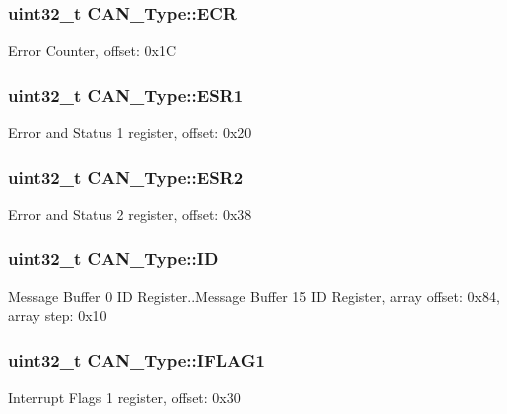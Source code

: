 \subsubsection[{\texorpdfstring{E\+CR}{ECR}}]{ uint32\+\_\+t C\+A\+N\+\_\+\+Type\+::\+E\+CR}\hypertarget{structCAN__Type_a561aab7ad4e38ae9ba75477bfbd74c63}{}\label{structCAN__Type_a561aab7ad4e38ae9ba75477bfbd74c63}
Error Counter, offset\+: 0x1C 
\subsubsection[{\texorpdfstring{E\+S\+R1}{ESR1}}]{ uint32\+\_\+t C\+A\+N\+\_\+\+Type\+::\+E\+S\+R1}\hypertarget{structCAN__Type_a9dfb3d60755ae52396ecafaf50ab3424}{}\label{structCAN__Type_a9dfb3d60755ae52396ecafaf50ab3424}
Error and Status 1 register, offset\+: 0x20 
\subsubsection[{\texorpdfstring{E\+S\+R2}{ESR2}}]{ uint32\+\_\+t C\+A\+N\+\_\+\+Type\+::\+E\+S\+R2}\hypertarget{structCAN__Type_a797820eae45745a20e8a600eaa6157ed}{}\label{structCAN__Type_a797820eae45745a20e8a600eaa6157ed}
Error and Status 2 register, offset\+: 0x38 
\subsubsection[{\texorpdfstring{ID}{ID}}]{ uint32\+\_\+t C\+A\+N\+\_\+\+Type\+::\+ID}\hypertarget{structCAN__Type_aa06e167951ec4103096d275e242808a3}{}\label{structCAN__Type_aa06e167951ec4103096d275e242808a3}
Message Buffer 0 ID Register..Message Buffer 15 ID Register, array offset\+: 0x84, array step\+: 0x10 
\subsubsection[{\texorpdfstring{I\+F\+L\+A\+G1}{IFLAG1}}]{ uint32\+\_\+t C\+A\+N\+\_\+\+Type\+::\+I\+F\+L\+A\+G1}\hypertarget{structCAN__Type_a53fce5d2964d6d4f2803ec56fd4391c1}{}\label{structCAN__Type_a53fce5d2964d6d4f2803ec56fd4391c1}
Interrupt Flags 1 register, offset\+: 0x30 
